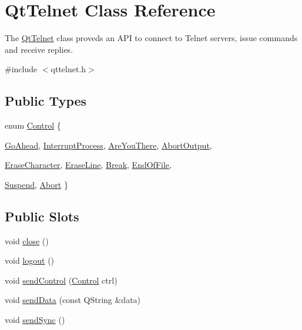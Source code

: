 \hypertarget{classQtTelnet}{
\section{QtTelnet Class Reference}
\label{classQtTelnet}
}


The \hyperlink{classQtTelnet}{QtTelnet} class proveds an API to connect to Telnet servers, issue commands and receive replies.  




{\ttfamily \#include $<$qttelnet.h$>$}

\subsection*{Public Types}
\begin{DoxyCompactItemize}
\item 
enum \hyperlink{classQtTelnet_a59ad635c17c3b531ac49a83bb406f89e}{Control} \{ \par
\hyperlink{classQtTelnet_a59ad635c17c3b531ac49a83bb406f89ea0f838ccc5ebd49da58435fb65750fc7f}{GoAhead}, 
\hyperlink{classQtTelnet_a59ad635c17c3b531ac49a83bb406f89eae2fe37e564d7fab67209a6352b3d66c6}{InterruptProcess}, 
\hyperlink{classQtTelnet_a59ad635c17c3b531ac49a83bb406f89ea01456777328aff57ea5b0d650f0c4f55}{AreYouThere}, 
\hyperlink{classQtTelnet_a59ad635c17c3b531ac49a83bb406f89ead9622371b21b81920a1d5edec5583e9c}{AbortOutput}, 
\par
\hyperlink{classQtTelnet_a59ad635c17c3b531ac49a83bb406f89eaec8abb4eceacf87f7347ef656f81ea32}{EraseCharacter}, 
\hyperlink{classQtTelnet_a59ad635c17c3b531ac49a83bb406f89eaeeca06730974bb161792dc779fee5f53}{EraseLine}, 
\hyperlink{classQtTelnet_a59ad635c17c3b531ac49a83bb406f89ea9495869000e0d6f8c30d91c37a371de3}{Break}, 
\hyperlink{classQtTelnet_a59ad635c17c3b531ac49a83bb406f89ea9b773f8362e15c07ccf34c925ed34061}{EndOfFile}, 
\par
\hyperlink{classQtTelnet_a59ad635c17c3b531ac49a83bb406f89eab4578000b4de6ee05478d9ed4164a7d8}{Suspend}, 
\hyperlink{classQtTelnet_a59ad635c17c3b531ac49a83bb406f89eae1fe14df493d4b6e566ad2489ec5e788}{Abort}
 \}
\end{DoxyCompactItemize}
\subsection*{Public Slots}
\begin{DoxyCompactItemize}
\item 
void \hyperlink{classQtTelnet_af3a32007f06949b28cee13ccbfbe1041}{close} ()
\item 
void \hyperlink{classQtTelnet_a9617e3c120e8ff9750b63c5fe4779f16}{logout} ()
\item 
void \hyperlink{classQtTelnet_aad51391ddbdae2c34a493f2d9ce68eae}{sendControl} (\hyperlink{classQtTelnet_a59ad635c17c3b531ac49a83bb406f89e}{Control} ctrl)
\item 
void \hyperlink{classQtTelnet_a9f48197f4356c4550e7b258daf89fb02}{sendData} (const QString \&data)
\item 
void \hyperlink{classQtTelnet_a57b0b9addff684501331df21f2f68259}{sendSync} ()
\end{DoxyCompactItemize}
